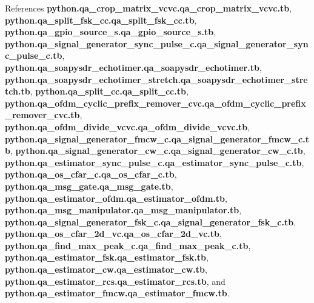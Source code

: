 References {\bf python.\+qa\+\_\+crop\+\_\+matrix\+\_\+vcvc.\+qa\+\_\+crop\+\_\+matrix\+\_\+vcvc.\+tb}, {\bf python.\+qa\+\_\+split\+\_\+fsk\+\_\+cc.\+qa\+\_\+split\+\_\+fsk\+\_\+cc.\+tb}, {\bf python.\+qa\+\_\+gpio\+\_\+source\+\_\+s.\+qa\+\_\+gpio\+\_\+source\+\_\+s.\+tb}, {\bf python.\+qa\+\_\+signal\+\_\+generator\+\_\+sync\+\_\+pulse\+\_\+c.\+qa\+\_\+signal\+\_\+generator\+\_\+sync\+\_\+pulse\+\_\+c.\+tb}, {\bf python.\+qa\+\_\+soapysdr\+\_\+echotimer.\+qa\+\_\+soapysdr\+\_\+echotimer.\+tb}, {\bf python.\+qa\+\_\+soapysdr\+\_\+echotimer\+\_\+stretch.\+qa\+\_\+soapysdr\+\_\+echotimer\+\_\+stretch.\+tb}, {\bf python.\+qa\+\_\+split\+\_\+cc.\+qa\+\_\+split\+\_\+cc.\+tb}, {\bf python.\+qa\+\_\+ofdm\+\_\+cyclic\+\_\+prefix\+\_\+remover\+\_\+cvc.\+qa\+\_\+ofdm\+\_\+cyclic\+\_\+prefix\+\_\+remover\+\_\+cvc.\+tb}, {\bf python.\+qa\+\_\+ofdm\+\_\+divide\+\_\+vcvc.\+qa\+\_\+ofdm\+\_\+divide\+\_\+vcvc.\+tb}, {\bf python.\+qa\+\_\+signal\+\_\+generator\+\_\+fmcw\+\_\+c.\+qa\+\_\+signal\+\_\+generator\+\_\+fmcw\+\_\+c.\+tb}, {\bf python.\+qa\+\_\+signal\+\_\+generator\+\_\+cw\+\_\+c.\+qa\+\_\+signal\+\_\+generator\+\_\+cw\+\_\+c.\+tb}, {\bf python.\+qa\+\_\+estimator\+\_\+sync\+\_\+pulse\+\_\+c.\+qa\+\_\+estimator\+\_\+sync\+\_\+pulse\+\_\+c.\+tb}, {\bf python.\+qa\+\_\+os\+\_\+cfar\+\_\+c.\+qa\+\_\+os\+\_\+cfar\+\_\+c.\+tb}, {\bf python.\+qa\+\_\+msg\+\_\+gate.\+qa\+\_\+msg\+\_\+gate.\+tb}, {\bf python.\+qa\+\_\+estimator\+\_\+ofdm.\+qa\+\_\+estimator\+\_\+ofdm.\+tb}, {\bf python.\+qa\+\_\+msg\+\_\+manipulator.\+qa\+\_\+msg\+\_\+manipulator.\+tb}, {\bf python.\+qa\+\_\+signal\+\_\+generator\+\_\+fsk\+\_\+c.\+qa\+\_\+signal\+\_\+generator\+\_\+fsk\+\_\+c.\+tb}, {\bf python.\+qa\+\_\+os\+\_\+cfar\+\_\+2d\+\_\+vc.\+qa\+\_\+os\+\_\+cfar\+\_\+2d\+\_\+vc.\+tb}, {\bf python.\+qa\+\_\+find\+\_\+max\+\_\+peak\+\_\+c.\+qa\+\_\+find\+\_\+max\+\_\+peak\+\_\+c.\+tb}, {\bf python.\+qa\+\_\+estimator\+\_\+fsk.\+qa\+\_\+estimator\+\_\+fsk.\+tb}, {\bf python.\+qa\+\_\+estimator\+\_\+cw.\+qa\+\_\+estimator\+\_\+cw.\+tb}, {\bf python.\+qa\+\_\+estimator\+\_\+rcs.\+qa\+\_\+estimator\+\_\+rcs.\+tb}, and {\bf python.\+qa\+\_\+estimator\+\_\+fmcw.\+qa\+\_\+estimator\+\_\+fmcw.\+tb}.

